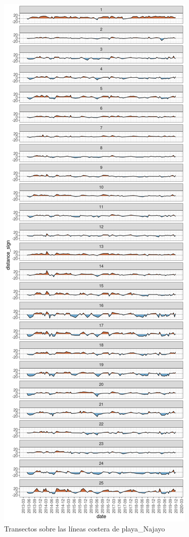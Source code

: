 \documentclass[11pt,]{article}
\begin{document}
\begin{figure}
\centering
\includegraphics{cambio_playa_Najayo.png}
\caption{Transectos sobre las líneas costera de
playa\_Najayo\label{cambio_transecto}}
\end{figure}
\end{document}

